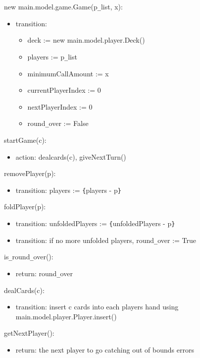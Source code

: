 \documentclass[12pt, titlepage]{article}
\begin{document}
\noindent new main.model.game.Game(p\verb|_|list, x):
\begin{itemize}
\item transition:
    \begin{itemize}
        \item deck := new main.model.player.Deck()
        \item players := p\verb|_|list
        \item minimumCallAmount := x
        \item currentPlayerIndex := 0
        \item nextPlayerIndex := 0
        \item round\verb|_|over := False
    \end{itemize}
\end{itemize}

\noindent startGame(c):
\begin{itemize}
\item action: dealcards(c), giveNextTurn()
\end{itemize}

\noindent removePlayer(p):
\begin{itemize}
\item transition: players := \verb|{|players - p\verb|}|\\
\end{itemize}

\noindent foldPlayer(p):
\begin{itemize}
\item transition: unfoldedPlayers := \verb|{|unfoldedPlayers - p\verb|}|\\
\item transition: if no more unfolded players, round\verb|_|over := True
\end{itemize}

\noindent is\verb|_|round\verb|_|over():
\begin{itemize}
    \item return: round\verb|_|over
\end{itemize}

\noindent dealCards(c):
\begin{itemize}
    \item transition: insert c cards into each players hand using main.model.player.Player.insert()
\end{itemize}

\noindent getNextPlayer():
\begin{itemize}
    \item return: the next player to go
    \exception catching out of bounds errors
\end{itemize}
\end{document}
